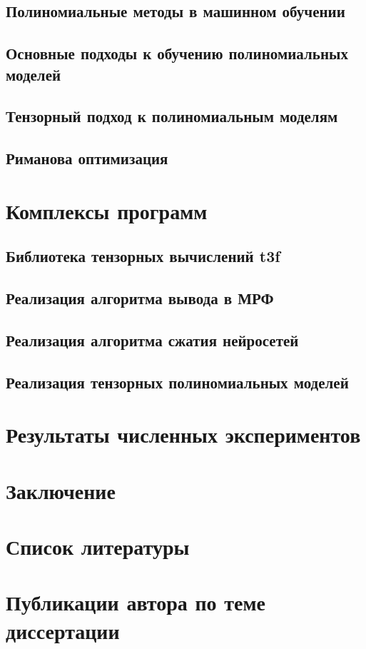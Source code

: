\documentclass{article} %
\begin{document}
\subsection{Полиномиальные методы в машинном обучении}
\subsection{Основные подходы к обучению полиномиальных моделей}
\subsection{Тензорный подход к полиномиальным моделям}
\subsection{Риманова оптимизация}
\section{Комплексы программ}
\subsection{Библиотека тензорных вычислений t3f}
\subsection{Реализация алгоритма вывода в МРФ}
\subsection{Реализация алгоритма сжатия нейросетей}
\subsection{Реализация тензорных полиномиальных моделей}
\section{Результаты численных экспериментов}
\section{Заключение}
\section{Список литературы}
\section{Публикации автора по теме диссертации}
\end{document}
